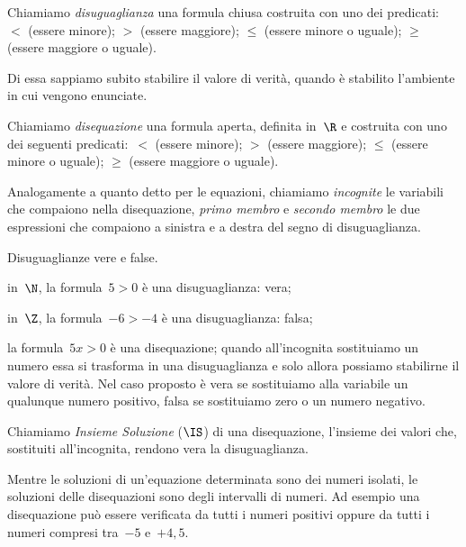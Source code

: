 \begin{definizione}{}{}
Chiamiamo \emph{disuguaglianza} una formula chiusa
costruita con uno dei predicati:~\(<\) (essere minore);
\(>\) (essere maggiore); \({\leq}\) (essere minore o uguale);
\({\geq}\) (essere maggiore o uguale).
\end{definizione}

Di essa sappiamo subito stabilire il valore di verità, quando è
stabilito l'ambiente in cui vengono enunciate.

\begin{definizione}{}{}
Chiamiamo \emph{disequazione} una formula aperta,
definita in~\(\R\) e costruita con uno dei seguenti predicati:~\(<\)
(essere minore); \(>\) (essere maggiore); \({\leq}\)
(essere minore o uguale); \({\geq}\) (essere
maggiore o uguale).
\end{definizione}

Analogamente a quanto detto per le equazioni, chiamiamo
\emph{incognite} le variabili che compaiono nella disequazione,
\emph{primo membro} e \emph{secondo membro} le due espressioni che
compaiono a sinistra e a destra del segno di disuguaglianza.
 \begin{esempio}{}{}
 Disuguaglianze vere e false.

 \begin{enumeratea}
\item in~\(\N\), la formula~\(5>0\) è una disuguaglianza: vera;
\item in~\(\Z\), la formula~\(-6>-4\) è una disuguaglianza: falsa;
\item la formula~\(5x>0\) è una disequazione; quando
all'incognita sostituiamo un numero essa si trasforma
in una disuguaglianza e solo allora possiamo stabilirne il valore di
verità. Nel caso proposto è vera se sostituiamo
alla variabile un qualunque numero positivo, falsa se
sostituiamo zero o un numero negativo.
\end{enumeratea}
 \end{esempio}



\begin{definizione}{}{}
Chiamiamo \emph{Insieme Soluzione} (\(\IS\)) di una disequazione, l'insieme
dei valori che, sostituiti all'incognita, rendono vera la disuguaglianza.
\end{definizione}

Mentre le soluzioni di un'equazione determinata sono dei numeri isolati, 
le soluzioni delle disequazioni sono degli intervalli di numeri.
Ad esempio una disequazione può essere verificata da tutti i numeri 
positivi oppure da tutti i numeri compresi tra~\(-5\) e~\(+4,5\).

